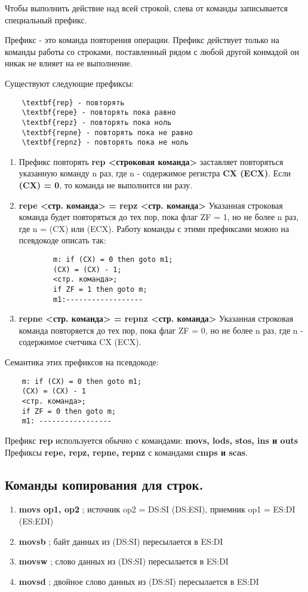 Чтобы выполнить действие над всей строкой, слева от команды записывается специальный префикс.

Префикс - это команда повторения операции. Префикс действует только на команды работы со строками, поставленный рядом с любой другой конмадой он никак не влияет на ее выполнение.

Существуют следующие префиксы:
\begin{verbatim}
    \textbf{rep} - повторять
    \textbf{repe} - повторять пока равно
    \textbf{repz} - повторять пока ноль
    \textbf{repne} - повторять пока не равно
    \textbf{repnz} - повторять пока не ноль
\end{verbatim}

\begin{enumerate}
    \item Префикс повторять \textbf{rep <строковая команда>} заставляет повторяться указанную команду n раз, где n - содержимое регистра \textbf{CX (ECX)}. Если \textbf{(CX) = 0}, то команда не выполнится ни разу.
    \item \textbf{repe <стр. команда> = repz <стр. команда>}
    Указанная строковая команда будет повторяться до тех пор, пока флаг ZF = 1, но не более n раз, где n = (CX) или (ECX). Работу команды с этими префиксами можно на псевдокоде описать так:
    \begin{verbatim}
        m: if (CX) = 0 then goto m1;
        (CX) = (CX) - 1;
        <стр. команда>;
        if ZF = 1 then goto m;
        m1:------------------
    \end{verbatim}
    \item \textbf{repne <стр. команда> = repnz <стр. команда>}
    Указанная строковая команда повторяется до тех пор, пока флаг ZF = 0, но не более n раз, где n - содержимое счетчика CX (ECX).
\end{enumerate}

Семантика этих префиксов на псевдокоде:

\begin{verbatim}
    m: if (CX) = 0 then goto m1;
    (CX) = (CX) - 1
    <стр. команда>;
    if ZF = 0 then goto m;
    m1: -----------------
\end{verbatim}
Префикс \textbf{rep} используется обычно с командами:
\textbf{movs, lods, stos, ins и outs}
Префиксы \textbf{repe, repz, repne, repnz} с командами \textbf{cmps и scas}.
\subsection{Команды копирования для строк.}
\begin{enumerate}
    \item \textbf{movs op1, op2} ; источник op2 = DS:SI (DS:ESI), приемник op1 = ES:DI (ES:EDI)
    \item \textbf{movsb} ; байт данных из (DS:SI) пересылается в ES:DI
    \item \textbf{movsw} ; слово данных из (DS:SI) пересылается в ES:DI
    \item \textbf{movsd} ; двойное слово данных из (DS:SI) пересылается в ES:DI
\end{enumerate}

